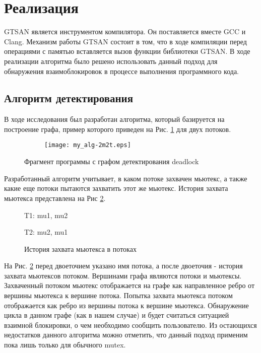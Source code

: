 \documentclass[runningheads, extrasrussian]{llncs}
\begin{document}
\section{Реализация}

GTSAN \cite{ref_clang} является инструментом компилятора. Он поставляется вместе GCC и Clang. Механизм работы GTSAN состоит в том, что в ходе компиляции перед операциями с памятью вставляется вызов функции библиотеки GTSAN. В ходе реализации алгоритма было решено использовать данный подход для обнаружения взаимоблокировок в процессе выполнения программного кода. 

\subsection{Алгоритм детектирования}

В ходе исследования был разработан алгоритма, который базируется на построение графа, пример которого приведен на Рис. \ref{fig:my_alg-2m2t} для двух потоков.

\begin{figure}[h]
    \centering
    \begin{subfigure}[h]{0.4\textwidth}
        \centering
        
    \end{subfigure}
    \hfill
    \begin{subfigure}[h]{0.4\textwidth}
        \centering
        \texttt{[image: my\_alg-2m2t.eps]}
    \end{subfigure}
    \caption{Фрагмент программы с графом детектирования deadlock}%
    \label{fig:my_alg-2m2t}
\end{figure}

Разработанный алгоритм учитывает, в каком потоке захвачен мьютекс, а также какие еще потоки пытаются захватить этот же мьютекс. История захвата мьютекса представлена на Рис \ref{fig:mutex-algo}.

\begin{figure}[h]
T1: mu1, mu2

T2: mu2, mu1
\caption{История захвата мьютекса в потоках} 
\label{fig:mutex-algo}
\end{figure}

На Рис. \ref{fig:mutex-algo} перед двоеточием указано имя потока, а после двоеточия - история захвата мьютексов потоком. Вершинами графа являются потоки и мьютексы. Захваченный потоком мьютекс отображается на графе как направленное ребро от вершины мьютекса к вершине потока. Попытка захвата мьютекса потоком отображается как ребро из вершины потока к вершине мьютекса. Обнаружение цикла в данном графе (как в нашем случае) и будет считаться ситуацией взаимной блокировки, о чем необходимо сообщить пользователю. Из остающихся недостатков данного алгоритма можно отметить, что данный подход применим пока лишь только для обычного mutex.
\end{document}

